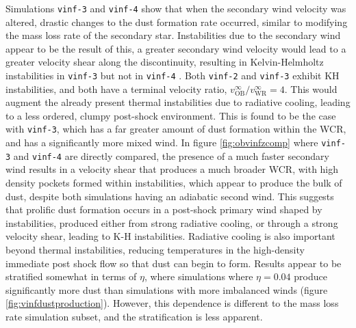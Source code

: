 Simulations \texttt{vinf-3} and \texttt{vinf-4} show that when the secondary wind velocity was altered, drastic changes to the dust formation rate occurred, similar to modifying the mass loss rate of the secondary star.
Instabilities due to the secondary wind appear to be the result of this, a greater secondary wind velocity would lead to a greater velocity shear along the discontinuity, resulting in Kelvin-Helmholtz instabilities in \texttt{vinf-3} but not in \texttt{vinf-4} \parencite{stevens_colliding_1992}.
Both \texttt{vinf-2} and \texttt{vinf-3} exhibit KH instabilities, and both have a terminal velocity ratio, $v_\text{OB}^\infty / v_\text{WR}^\infty = 4$.
This would augment the already present thermal instabilities due to radiative cooling, leading to a less ordered, clumpy post-shock environment.
This is found to be the case with \texttt{vinf-3}, which has a far greater amount of dust formation within the WCR, and has a significantly more mixed wind.
In figure \ref{fig:obvinfzcomp} where \texttt{vinf-3} and \texttt{vinf-4} are directly compared, the presence of a much faster secondary wind results in a velocity shear that produces a much broader WCR, with high density pockets formed within instabilities, which appear to produce the bulk of dust, despite both simulations having an adiabatic second wind. 
This suggests that prolific dust formation occurs in a post-shock primary wind shaped by instabilities, produced either from strong radiative cooling, or through a strong velocity shear, leading to K-H instabilities.
Radiative cooling is also important beyond thermal instabilities, reducing temperatures in the high-density immediate post shock flow so that dust can begin to form.
Results appear to be stratified somewhat in terms of $\eta$, where simulations where $\eta = 0.04$ produce significantly more dust than simulations with more imbalanced winds (figure \ref{fig:vinfdustproduction}).
However, this dependence is different to the mass loss rate simulation subset, and the stratification is less apparent.


